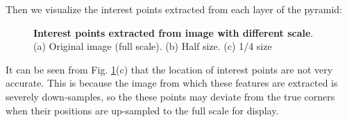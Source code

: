 \documentclass[a4paper]{article}
\begin{document}
Then we visualize the interest points extracted from each layer of the pyramid: \\
\begin{figure}[h]
  \centering
  \hfill
  \hfill
  \caption{\textbf{Interest points extracted from image with different scale}. (a) Original image (full scale). (b) Half size. (c) 1/4 size}
  \label{fig:three_scales}
\end{figure}

It can be seen from Fig. \ref{fig:three_scales}(c) that the location of interest points are not very accurate. This is because the image from which these features are extracted is severely down-samples, so the these points may deviate from the true corners when their positions are up-sampled to the full scale for display.
\end{document}
